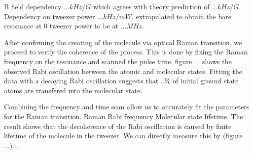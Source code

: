 \documentclass[aps,prl,twocolumn,groupedaddress]{revtex4-1}
\newcommand{\todo}[1]{}
\begin{document}
B field dependency $... kHz/G$ which agrees with theory prediction of $... kHz/G$.
Dependency on tweezer power $... kHz/mW$, extrapulated to obtain the bare resonance at $0$ tweezer power to be at $... MHz$.

After confirming the creating of the molecule via optical Raman transition, we proceed to verify the coherence of the process. This is done by fixing the Raman frequency on the resonance and scanned the pulse time. figure ... shows the observed Rabi oscillation between the atomic and molecular states. Fitting the data with a decaying Rabi oscillation suggests that $..\%$ of initial ground state atoms are transfered into the molecular state.

\todo{Atomic lifetime}

Combining the frequency and time scan allow us to accurately fit the parameters for the Raman transition.
Raman Rabi frequency
Molecular state lifetime.
The result shows that the decoherence of the Rabi oscillation is caused by finite lifetime of the molecule in the tweezer.
We can directly measure this by \todo{pulse sequence} (figure ...)...

\todo{Lifetime}

\todo{Fitting}

\todo{Scattering}

\todo{sm: STIRAP vs Raman}


\end{document}
